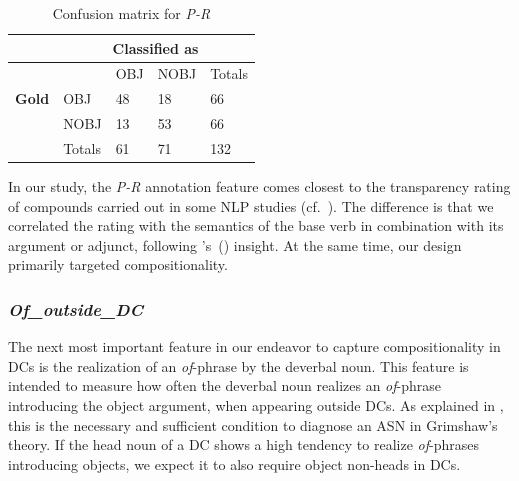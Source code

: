 \documentclass[output=paper]{langsci/langscibook}
\begin{document}
\begin{table}
\caption{\label{tab:conf:p-r} Confusion matrix for \textit{P-R}}
{\footnotesize
\begin{tabular}{|l|l|l|l|l|}
\hline
&\multicolumn{4}{c|}{\textbf{Classified as}}\\
\hline
&&  OBJ&NOBJ&Totals \\    
\textbf{Gold} & OBJ &48 &18&66 \\
& NOBJ&13 & 53&66  \\
\hline
&Totals&61 &71&132\\
\hline
\end{tabular}}
\end{table}



In our study, the \textit{P-R} annotation feature comes closest to the  {transparency} rating of compounds carried out in some NLP studies (cf.~). The difference is that we correlated the rating with the semantics of the base verb in combination with its argument or adjunct, following \citeauthor{grimshaw:90}'s~(\citeyear{grimshaw:90}) insight.  {At the same time, our design primarily targeted compositionality.} 


\subsubsection{\textit{Of\_outside\_DC}}\label{sec:discussion-int-of}

The next most important feature in our endeavor to capture compositionality in DCs is the realization of an \textit{of}-phrase by the deverbal noun. This feature is intended to measure how often the deverbal noun realizes an \textit{of}-phrase introducing the object argument, when appearing outside DCs. As explained in , this is the necessary and sufficient condition to diagnose an ASN in Grimshaw's theory. If the head noun of a DC shows a high tendency to realize \textit{of}-phrases introducing objects, we expect it to also require object non-heads in DCs.
\end{document}
